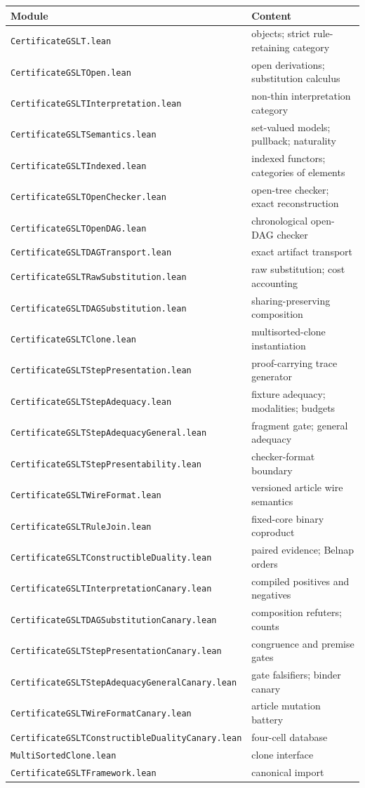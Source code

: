 \documentclass[]{article}
\theoremstyle{remark}
\newcommand{\code}[1]{\texttt{#1}}
\begin{document}
\begin{center}
\begin{tabular}{ll}
\toprule
Module & Content \\
\midrule
\code{CertificateGSLT.lean} & objects; strict rule-retaining category \\
\code{CertificateGSLTOpen.lean} & open derivations; substitution calculus \\
\code{CertificateGSLTInterpretation.lean} & non-thin interpretation category \\
\code{CertificateGSLTSemantics.lean} & set-valued models; pullback; naturality \\
\code{CertificateGSLTIndexed.lean} & indexed functors; categories of elements \\
\code{CertificateGSLTOpenChecker.lean} & open-tree checker; exact reconstruction \\
\code{CertificateGSLTOpenDAG.lean} & chronological open-DAG checker \\
\code{CertificateGSLTDAGTransport.lean} & exact artifact transport \\
\code{CertificateGSLTRawSubstitution.lean} & raw substitution; cost accounting \\
\code{CertificateGSLTDAGSubstitution.lean} & sharing-preserving composition \\
\code{CertificateGSLTClone.lean} & multisorted-clone instantiation \\
\code{CertificateGSLTStepPresentation.lean} & proof-carrying trace generator \\
\code{CertificateGSLTStepAdequacy.lean} & fixture adequacy; modalities; budgets \\
\code{CertificateGSLTStepAdequacyGeneral.lean} & fragment gate; general adequacy \\
\code{CertificateGSLTStepPresentability.lean} & checker-format boundary \\
\code{CertificateGSLTWireFormat.lean} & versioned article wire semantics \\
\code{CertificateGSLTRuleJoin.lean} & fixed-core binary coproduct \\
\code{CertificateGSLTConstructibleDuality.lean} & paired evidence; Belnap orders \\
\code{CertificateGSLTInterpretationCanary.lean} & compiled positives and negatives \\
\code{CertificateGSLTDAGSubstitutionCanary.lean} & composition refuters; counts \\
\code{CertificateGSLTStepPresentationCanary.lean} & congruence and premise gates \\
\code{CertificateGSLTStepAdequacyGeneralCanary.lean} & gate falsifiers; binder canary \\
\code{CertificateGSLTWireFormatCanary.lean} & article mutation battery \\
\code{CertificateGSLTConstructibleDualityCanary.lean} & four-cell database \\
\code{MultiSortedClone.lean} & clone interface \\
\code{CertificateGSLTFramework.lean} & canonical import \\
\bottomrule
\end{tabular}
\end{center}
\end{document}
